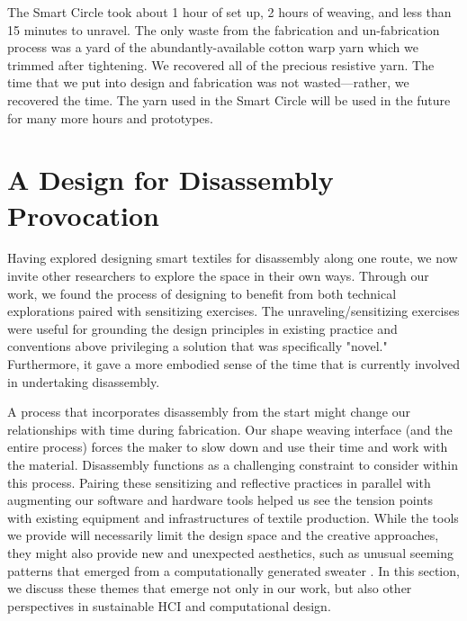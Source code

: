 \documentclass{sigchi}
\begin{document}
The Smart Circle took about 1 hour of set up, 2 hours of weaving, and less than 15 minutes to unravel. The only waste from the fabrication and un-fabrication process was a yard of the abundantly-available cotton warp yarn which we trimmed after tightening. We recovered all of the precious resistive yarn. The time that we put into design and fabrication was not wasted---rather, we recovered the time. The yarn used in the Smart Circle will be used in the future for many more hours and prototypes.

\section{A Design for Disassembly Provocation}

Having explored designing smart textiles for disassembly along one route, we now invite other researchers to explore the space in their own ways. Through our work, we found the process of designing to benefit from both technical explorations paired with sensitizing exercises. The unraveling/sensitizing exercises were useful for grounding the design principles in existing practice and conventions above privileging a solution that was specifically "novel." Furthermore, it gave a more embodied sense of the time that is currently involved in undertaking disassembly.

A process that incorporates disassembly from the start might change our relationships with time during fabrication. Our shape weaving interface (and the entire process) forces the maker to slow down and use their time and work with the material. Disassembly functions as a challenging constraint to consider within this process. %
Pairing these sensitizing and reflective practices in parallel with augmenting our software and hardware tools helped us see the tension points with existing equipment and infrastructures of textile production. %
While the tools we provide will necessarily limit the design space and the creative approaches, they might also provide new and unexpected aesthetics, such as unusual seeming patterns that emerged from a computationally generated sweater \cite{beta_brand_brown}. In this section, we discuss these themes that emerge not only in our work, but also other perspectives in sustainable HCI and computational design.
\end{document}
